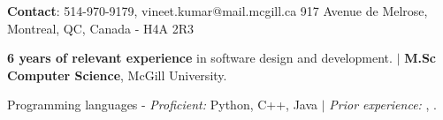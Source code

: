 \documentclass{resume} %
\begin{document}
\begin{hSubsection}{\textbf{Contact}: 514-970-9179, vineet.kumar@mail.mcgill.ca}
{%
}{917 Avenue de Melrose, Montreal, QC, Canada - H4A 2R3}
\end{hSubsection}



\smallskip \smallskip 
\begin{rSection}{} \smallskip \begin{lSubsection} 
\item \textbf{6 years of relevant experience} in software design and
development. $\vert$ \textbf{M.Sc Computer Science}, McGill University. 
\item Programming languages - \emph{Proficient:} Python,
  C++, Java
$\vert$ \emph{Prior experience:} \xtenx, \matlabx.
\end{lSubsection}
\end{rSection}
\end{document}
